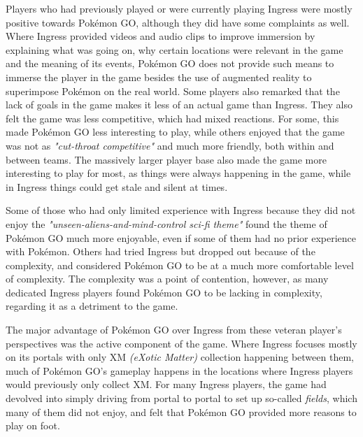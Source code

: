 Players who had previously played or were currently playing Ingress were mostly positive towards Pokémon GO, although they did have some complaints as well. Where Ingress provided videos and audio clips to improve immersion by explaining what was going on, why certain locations were relevant in the game and the meaning of its events, Pokémon GO does not provide such means to immerse the player in the game besides the use of augmented reality to superimpose Pokémon on the real world. Some players also remarked that the lack of goals in the game makes it less of an actual game than Ingress. They also felt the game was less competitive, which had mixed reactions. For some, this made Pokémon GO less interesting to play, while others enjoyed that the game was not as \emph{"cut-throat competitive"} and much more friendly, both within and between teams. The massively larger player base also made the game more interesting to play for most, as things were always happening in the game, while in Ingress things could get stale and silent at times.

Some of those who had only limited experience with Ingress because they did not enjoy the \emph{"unseen-aliens-and-mind-control sci-fi theme"} found the theme of Pokémon GO much more enjoyable, even if some of them had no prior experience with Pokémon. Others had tried Ingress but dropped out because of the complexity, and considered Pokémon GO to be at a much more comfortable level of complexity. The complexity was a point of contention, however, as many dedicated Ingress players found Pokémon GO to be lacking in complexity, regarding it as a detriment to the game.

The major advantage of Pokémon GO over Ingress from these veteran player's perspectives was the active component of the game. Where Ingress focuses mostly on its portals with only XM \emph{(eXotic Matter)} collection happening between them, much of Pokémon GO's gameplay happens in the locations where Ingress players would previously only collect XM. For many Ingress players, the game had devolved into simply driving from portal to portal to set up so-called \emph{fields}, which many of them did not enjoy, and felt that Pokémon GO provided more reasons to play on foot.

